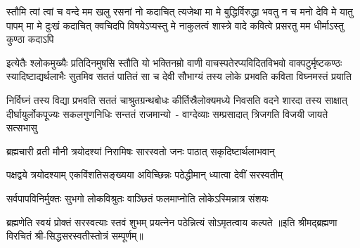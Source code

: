 \fourlineindentedshloka
{स्तौमि त्वां त्वां च वन्दे मम खलु रसनां नो कदाचित् त्यजेथा}
{मा मे बुद्धिर्विरुद्धा भवतु न च मनो देवि मे यातु पापम्}
{मा मे दुःखं कदाचित् क्वचिदपि विषयेऽप्यस्तु मे नाकुलत्वं}
{शास्त्रे वादे कवित्वे प्रसरतु मम धीर्माऽस्तु कुण्ठा कदाऽपि}

\fourlineindentedshloka
{इत्येतैः श्लोकमुख्यैः प्रतिदिनमुषसि स्तौति यो भक्तिनम्रो}
{वाणी वाचस्पतेरप्यविदितविभवो वाक्पटुर्मृष्टकण्ठः}
{स्यादिष्टाद्यर्थलाभैः सुतमिव सततं पातितं सा च देवी}
{सौभाग्यं तस्य लोके प्रभवति कविता विघ्नमस्तं प्रयाति}

\fourlineindentedshloka
{निर्विघ्नं तस्य विद्या प्रभवति सततं चाश्रुतग्रन्थबोधः}
{कीर्तिस्रैलोक्यमध्ये निवसति वदने शारदा तस्य साक्षात्}
{दीर्घायुर्लोकपूज्यः सकलगुणनिधिः सन्ततं राजमान्यो~-}
{वाग्देव्याः सम्प्रसादात् त्रिजगति विजयी जायते सत्सभासु}

\twolineshloka
{ब्रह्मचारी व्रती मौनी त्रयोदश्यां निरामिषः}
{सारस्वतो जनः पाठात् सकृदिष्टार्थलाभवान्}

\twolineshloka
{पक्षद्वये त्रयोदश्याम् एकविंशतिसङ्ख्यया}
{अविच्छिन्नः पठेद्धीमान् ध्यात्वा देवीं सरस्वतीम्}

\twolineshloka
{सर्वपापविनिर्मुक्तः सुभगो लोकविश्रुतः}
{वाञ्छितं फलमाप्नोति लोकेऽस्मिन्नात्र संशयः}

\twolineshloka
{ब्रह्मणेति स्वयं प्रोक्तं सरस्वत्याः स्तवं शुभम्}
{प्रयत्नेन पठेन्नित्यं सोऽमृतत्वाय कल्पते}
॥इति श्रीमद्ब्रह्मणा विरचितं श्री-सिद्धसरस्वतीस्तोत्रं सम्पूर्णम्॥
\setlength{\shlokaspaceskip}{24pt}